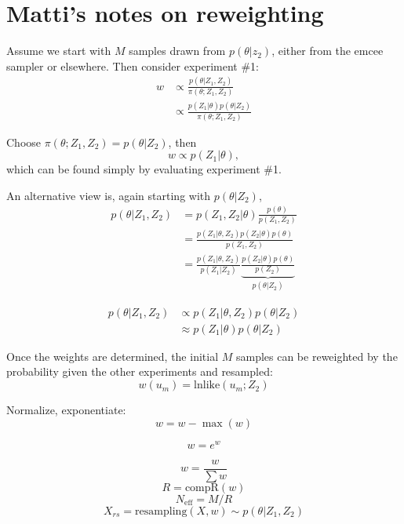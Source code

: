 \documentclass{tufte-handout}
\begin{document}
\section{Matti's notes on reweighting}
Assume we start with $M$ samples drawn from $p(\theta|z_2)$, either
from the emcee sampler or elsewhere. Then consider experiment \#1:
\begin{align}
  \label{eq:1}
  w & \propto \frac{ p(\theta|Z_1,Z_2) }{\pi(\theta; Z_1, Z_2)}\\
  & \propto \frac{ p(Z_1|\theta) p (\theta|Z_2)}{\pi(\theta; Z_1, Z_2)}
\end{align}

Choose $\pi(\theta; Z_1, Z_2) = p(\theta|Z_2)$, then
\begin{equation*}
  w \propto p(Z_1 | \theta),
\end{equation*}
which can be found simply by evaluating experiment \#1. 

An alternative view is, again starting with $p(\theta|Z_2)$,
\begin{align*}
  p(\theta|Z_1,Z_2) &= p (Z_1, Z_2 | \theta) \frac{
    p(\theta)}{p(Z_1,Z_2)} \\
& = \frac{p(Z_1|\theta, Z_2) p(Z_2|\theta) p(\theta)}{ p(Z_1,Z_2)}\\
 & = \frac{p(Z_1|\theta, Z_2)}{p(Z_1|Z_2)} \underbrace{\frac{p(Z_2|\theta)p(\theta)}{p(Z_2)}}_{p(\theta|Z_2)}
\end{align*}

\begin{align*}
  p(\theta|Z_1,Z_2)& \propto p(Z_1|\theta, Z_2) p(\theta|Z_2) \\
  & \approx p(Z_1|\theta) p(\theta|Z_2)
\end{align*}

Once the weights are determined, the initial $M$ samples can be
reweighted by the probability given the other experiments and resampled:
\begin{equation*}
  w(u_m) = \mathrm{lnlike}(u_m; Z_2)
\end{equation*}

Normalize, exponentiate:
\begin{equation*}
  w = w - \max(w)
\end{equation*}

\begin{equation*}
  w = e^w
\end{equation*}

\begin{equation*}
  w = \frac{w}{\sum w}
\end{equation*}
\begin{equation*}
  R = \mathrm{compR}(w)
\end{equation*}
\begin{equation*}
  N_{\mathrm{eff}} = M/R
\end{equation*}
\begin{equation*}
  X_{rs} = \mathrm{resampling}(X,w) \sim p(\theta|Z_1,Z_2)
\end{equation*}


\end{document}
